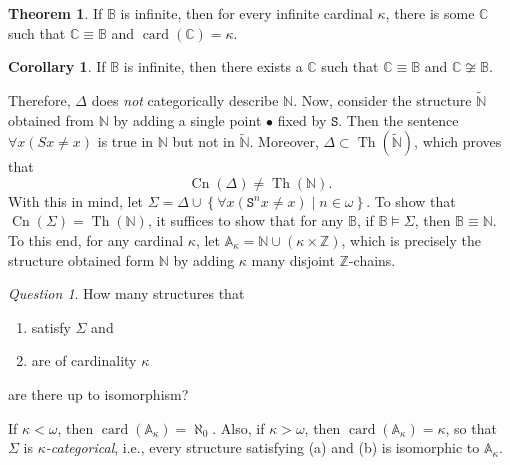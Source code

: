 \documentclass[10pt,letterpaper,cm]{nupset}
\theoremstyle{definition}
\theoremstyle{theorem}
\newtheorem{theorem}[definition]{Theorem}
\newtheorem{corollary}[definition]{Corollary}
\theoremstyle{remark}
\newtheorem*{question}{Question}
\newcommand{\A}{\mathbb A}
\newcommand{\C}{\mathbb C}
\newcommand{\N}{\mathbb N}
\renewcommand{\S}{\mathtt S}
\newcommand{\Z}{\mathbb Z}
\newcommand{\B}{\mathbb{B}}
\newcommand{\1}{\mathbf{1}}
\newcommand{\0}{\mathsf 0}
\DeclareMathOperator{\card}{\text{card}}
\DeclareMathOperator{\thh}{Th}
\DeclareMathOperator{\cn}{Cn}
\begin{document}
\smallskip

\begin{theorem}
If $\B$ is infinite, then for every infinite  cardinal $\kappa$, there is some $\C$ such that $\C \equiv \B$ and $\card(\C) = \kappa$.
\end{theorem}

\begin{corollary}
If $\B$ is infinite, then there exists a $\C$ such that $\C \equiv \B$ and $\C \not\cong \B$.
\end{corollary}

Therefore, $\Delta$ does \emph{not} categorically describe $\N$. Now, consider the structure $\widetilde{\N}$ obtained from $\N$ by adding a single point $\bullet$ fixed by $\S$. Then the sentence $\forall{x}\left(S{x} \ne x\right)$ is true in $\N$ but not in $\widetilde{\N}$. Moreover, $\Delta \subset \thh(\widetilde{\N})$, which proves that $$\cn(\Delta) \ne \thh(\N).$$ With this in mind, let $\Sigma = \Delta \cup \left\{ \forall{x}\left(\S^n{x} \ne x\right) \mid n \in \omega \right\}$. To show that $\cn(\Sigma) = \thh(\N)$, it suffices to show that for any $\B$, if $\B \models \Sigma$, then $\B \equiv \N$. To this end, for any cardinal $\kappa$, let $\A_{\kappa} = \N \cup \left(\kappa \times \Z\right)$, which is precisely the structure obtained form $\N$ by adding $\kappa$ many disjoint $\Z$-chains.

\begin{question}
How many structures that 
\begin{enumerate}[label=(\alph*)]
\item satisfy $\Sigma$ and 
\item are of cardinality $\kappa$ 
\end{enumerate}
are there up to isomorphism?
\end{question}

If $\kappa < \omega$, then $\card(\A_{\kappa}) = \aleph_0$. Also, if  $\kappa > \omega$, then $\card(\A_{\kappa}) = \kappa$, so that $\Sigma$ is \textit{$\kappa$-categorical}, i.e., every structure satisfying (a) and (b) is isomorphic to $\A_{\kappa}$.  
\end{document}
